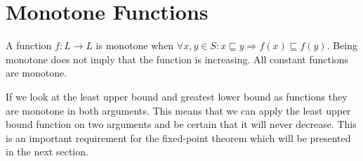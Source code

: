 \section{Monotone Functions}
A function $f: L \to L$ is monotone when $\forall x,y \in S : x \sqsubseteq y \Rightarrow f(x) \sqsubseteq f(y)$.
Being monotone does not imply that the function is increasing.
All constant functions are monotone.

If we look at the least upper bound and greatest lower bound as functions they are monotone in both arguments.
This means that we can apply the least upper bound function on two arguments and be certain that it will never decrease.
This is an important requirement for the fixed-point theorem which will be presented in the next section.
